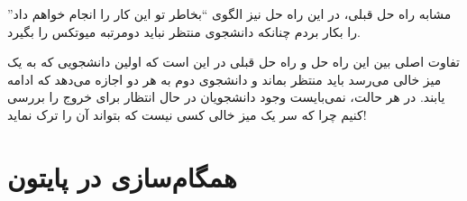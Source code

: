 \documentclass{book}
\newcommand{\clearemptydoublepage}{\newpage\cleardoublepage}
\begin{document}
    مشابه راه حل قبلی، در این راه حل نیز الگوی ``بخاطر تو این کار را انجام خواهم داد'' را بکار بردم چنانکه دانشجوی منتظر نباید دومرتبه میوتکس را بگیرد. 

    تفاوت اصلی بین این راه حل و راه حل قبلی در این است که اولین دانشجویی که به یک میز خالی می‌رسد باید منتظر بماند و دانشجوی دوم به هر دو اجازه 
    می‌دهد که ادامه یابند. در هر حالت، نمی‌بایست وجود دانشجویان در حال انتظار برای خروج را بررسی کنیم چرا که سر یک میز خالی کسی نیست که بتواند
    آن را ترک نماید!
    










\chapter{همگام‌سازی در پایتون}
\label{pysync}
\end{document}
